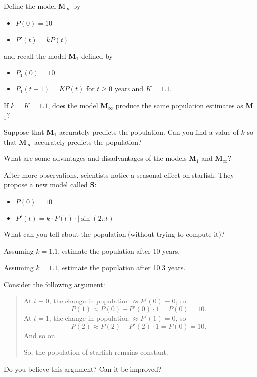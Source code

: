 \documentclass{workbook}
\begin{document}
\begin{slide}
	\question
	Define the model \textbf{M$_\infty$} by
	\begin{itemize}
		\item $P(0)=10$
		\item $P'(t) = kP(t)$
	\end{itemize}
	and recall the model \textbf{M$_1$} defined by
	\begin{itemize}
		\item $P_1(0)=10$
		\item $P_1(t+1) = KP(t)$ for $t\geq 0$ years and $K=1.1$.
	\end{itemize}


	\begin{parts}
		\item If $k=K=1.1$, does the model \textbf{M$_\infty$} produce the same population estimates as \textbf{M$_1$}?
		\item Suppose that \textbf{M$_1$} accurately predicts the population. Can you find a value of $k$ so that \textbf{M$_\infty$}
		accurately predicts the population?
		\item What are some advantages and disadvantages of the models \textbf{M$_1$} and \textbf{M$_\infty$}?
	\end{parts}
\end{slide}

\begin{slide}
	\question
	After more observations, scientists notice a seasonal effect on starfish. They propose a new model called \textbf{S}:
	\begin{itemize}
		\item $P(0)=10$
		\item $P'(t) = k\cdot P(t)\cdot |\sin(2\pi t)|$
	\end{itemize}
	
	\begin{parts}
		\item What can you tell about the population (without trying to compute it)?
		\item Assuming $k=1.1$, estimate the population after 10 years.
		\item Assuming $k=1.1$, estimate the population after 10.3 years.
	\end{parts}
\end{slide}

\begin{slide}
	\question
	Consider the following argument:
	\begin{quote}
		\color{blue}
		At $t=0$, the change in population $\approx P'(0)=0$, so
		\[
			P(1) \approx P(0)+P'(0)\cdot 1 = P(0)=10.
		\]
		At $t=1$, the change in population $\approx P'(1)=0$, so
		\[
			P(2) \approx P(2)+P'(2)\cdot 1 = P(0)=10.
		\]
		And so on.

		So, the population of starfish remains constant.
	\end{quote}
	
	\begin{parts}
		\item Do you believe this argument? Can it be improved?
	\end{parts}
\end{slide}
\end{document}

